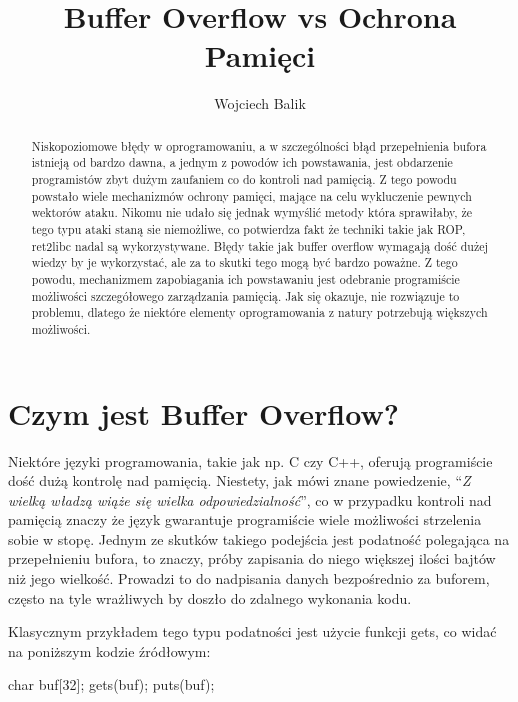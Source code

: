 \documentclass[polish]{kbk}
\begin{document}
\author{Wojciech Balik}
\title{Buffer Overflow vs Ochrona Pamięci}


\maketitle

\begin{abstract}
Niskopoziomowe błędy w oprogramowaniu, a w szczególności błąd przepełnienia
bufora istnieją od bardzo dawna, a jednym z powodów ich powstawania, jest 
obdarzenie programistów zbyt dużym zaufaniem co do kontroli nad pamięcią. 
Z tego powodu powstało wiele mechanizmów ochrony pamięci, mające na celu
wykluczenie pewnych wektorów ataku. Nikomu nie udało się jednak wymyślić
metody która sprawiłaby, że tego typu ataki staną sie niemożliwe, co
potwierdza fakt że techniki takie jak ROP, ret2libc nadal są wykorzystywane.
Błędy takie jak buffer overflow wymagają dość dużej wiedzy by je wykorzystać,
ale za to skutki tego mogą być bardzo poważne. Z tego powodu, mechanizmem 
zapobiagania ich powstawaniu jest odebranie programiście możliwości
szczegółowego zarządzania pamięcią. Jak się okazuje, nie rozwiązuje
to problemu, dlatego że niektóre elementy oprogramowania z natury potrzebują
większych możliwości.
\end{abstract}

\section{Czym jest Buffer Overflow?}
Niektóre języki programowania, takie jak np. C czy C++, oferują programiście
dość dużą kontrolę nad pamięcią. Niestety, jak mówi znane powiedzenie,
``\emph{Z wielką władzą wiąże się wielka odpowiedzialność}'', co w przypadku 
kontroli nad pamięcią znaczy że język gwarantuje programiście wiele możliwości
strzelenia sobie w stopę. Jednym ze skutków takiego podejścia jest podatność 
polegająca na przepełnieniu bufora, to znaczy, próby zapisania do niego 
większej ilości bajtów niż jego wielkość. Prowadzi to do nadpisania danych 
bezpośrednio za buforem, często na tyle wrażliwych by doszło do zdalnego 
wykonania kodu. 
\par
Klasycznym przykładem tego typu podatności jest użycie funkcji gets, co widać na 
poniższym kodzie źródłowym:

\begin{flushleft}
char buf[32];\newline
gets(buf);\newline
puts(buf);
\end{flushleft}
\end{document}
